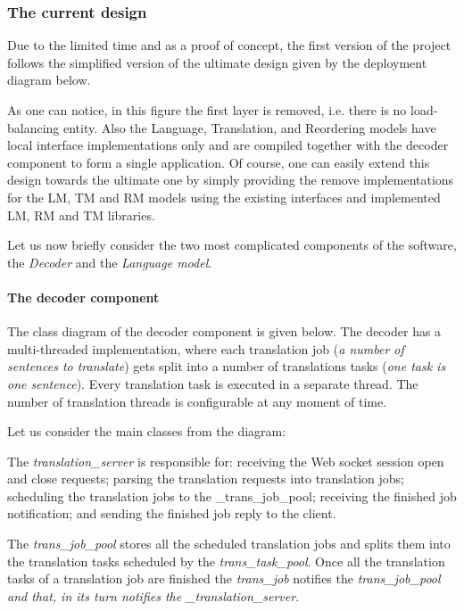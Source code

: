 \subsubsection*{The current design}

Due to the limited time and as a proof of concept, the first version of the project follows the simplified version of the ultimate design given by the deployment diagram below.



As one can notice, in this figure the first layer is removed, i.\+e. there is no load-\/balancing entity. Also the Language, Translation, and Reordering models have local interface implementations only and are compiled together with the decoder component to form a single application. Of course, one can easily extend this design towards the ultimate one by simply providing the remove implementations for the L\+M, T\+M and R\+M models using the existing interfaces and implemented L\+M, R\+M and T\+M libraries.

Let us now briefly consider the two most complicated components of the software, the {\itshape Decoder} and the {\itshape Language model}.

\paragraph*{The decoder component}

The class diagram of the decoder component is given below. The decoder has a multi-\/threaded implementation, where each translation job ({\itshape a number of sentences to translate}) gets split into a number of translations tasks ({\itshape one task is one sentence}). Every translation task is executed in a separate thread. The number of translation threads is configurable at any moment of time.



Let us consider the main classes from the diagram\+:

The {\itshape translation\+\_\+server} is responsible for\+: receiving the Web socket session open and close requests; parsing the translation requests into translation jobs; scheduling the translation jobs to the \+\_\+trans\+\_\+job\+\_\+pool; receiving the finished job notification; and sending the finished job reply to the client.

The {\itshape trans\+\_\+job\+\_\+pool} stores all the scheduled translation jobs and splits them into the translation tasks scheduled by the {\itshape trans\+\_\+task\+\_\+pool}. Once all the translation tasks of a translation job are finished the {\itshape trans\+\_\+job} notifies the {\itshape trans\+\_\+job\+\_\+pool and that, in its turn notifies the \+\_\+translation\+\_\+server}.

